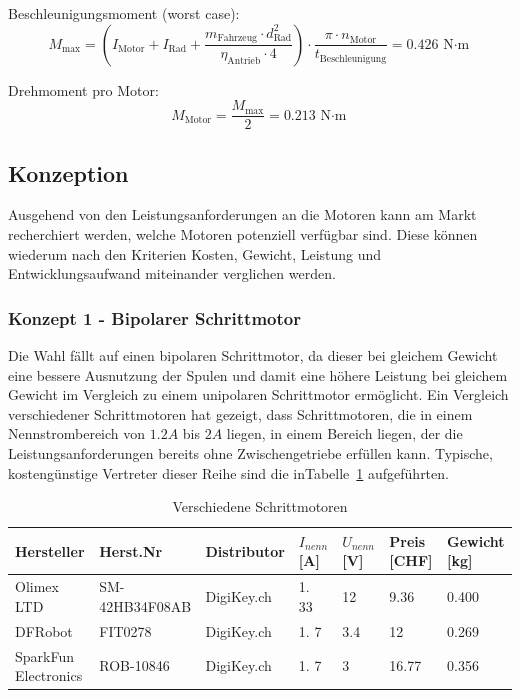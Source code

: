 \documentclass[main.  tex]{subfiles} %
\begin{document}
\vspace{0.2cm}

Beschleunigungsmoment (worst case):
\[
M_{\text{max}} = \left( I_{\text{Motor}} + I_{\text{Rad}} + \frac{m_{\text{Fahrzeug}} \cdot d_{\text{Rad}}^2}{\eta_{\text{Antrieb}} \cdot 4} \right) \cdot \frac{\pi \cdot n_{\text{Motor}}}{t_{\text{Beschleunigung}}} = 0.426 \, \si{\newton \cdot \meter}
\]

\vspace{0.2cm}

Drehmoment pro Motor:
\[
M_{\text{Motor}} = \frac{M_{\text{max}}}{2} = 0.213 \, \si{\newton\cdot \meter}
\]

\newpage

\subsection*{Konzeption}

Ausgehend von den Leistungsanforderungen an die Motoren kann am Markt
recherchiert werden, welche Motoren potenziell verfügbar sind. Diese können
wiederum nach den Kriterien Kosten, Gewicht, Leistung und Entwicklungsaufwand
miteinander verglichen werden.

\subsubsection*{Konzept 1 - Bipolarer Schrittmotor} %

Die Wahl fällt auf einen bipolaren Schrittmotor, da dieser bei gleichem Gewicht
eine bessere Ausnutzung der Spulen und damit eine höhere Leistung bei gleichem
Gewicht im Vergleich zu einem unipolaren Schrittmotor ermöglicht. Ein Vergleich
verschiedener Schrittmotoren hat gezeigt, dass Schrittmotoren, die in einem
Nennstrombereich von $1. 2A$ bis $2A$ liegen, in einem Bereich liegen, der die
Leistungsanforderungen bereits ohne Zwischengetriebe erfüllen kann. Typische,
kostengünstige Vertreter dieser Reihe sind die
inTabelle~\ref{tab:Schrittmotoren_different} aufgeführten.

\begin{table}[h]
    \centering
    \begin{tabular}{|p{2cm}|p{3cm}|p{2cm}|p{1cm}|p{1cm}|p{1cm}|p{1.5cm}|}
        \hline
        Hersteller           & Herst.Nr       & Distributor  & $I_{nenn} $ [A] & $U_{nenn}$ [V] & Preis [CHF] & Gewicht [kg] \\ \hline
        Olimex LTD           & SM-42HB34F08AB & DigiKey.ch   & 1.  33          & 12             & 9.36        & 0.400        \\ \hline
        DFRobot              & FIT0278        & DigiKey.ch   & 1.  7           & 3.4            & 12          & 0.269        \\ \hline
        SparkFun Electronics & ROB-10846      & DigiKey.ch   & 1.  7           & 3              & 16.77       & 0.356        \\ \hline
    \end{tabular}
    \caption{Verschiedene Schrittmotoren}
    \label{tab:Schrittmotoren_different}
\end{table}
\end{document}
